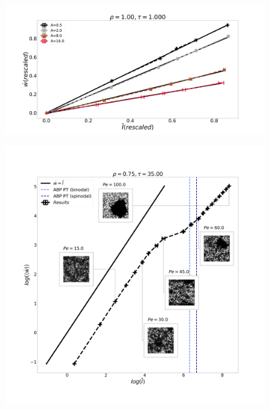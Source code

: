 \documentclass[amsmath,preprintnumbers,10pt,nofootinbib,prl,twocolumn]{revtex4-1}
\begin{document}
\begin{figure}
    \centering
    \includegraphics[scale=0.1, clip=True]{Plots_dW_tI_Suri_R1.00_A16.00_U1.000.pdf}
    \caption{}
    \label{Fig:n}
\end{figure}

\begin{figure}
    \centering
    \includegraphics[scale=0.1, clip=True]{log_dW_tI_PT_R0.75_T35.00.png}
    \caption{}
    \label{Fig:n}
\end{figure}

\end{document}
